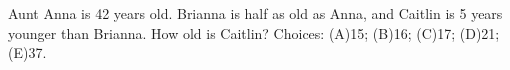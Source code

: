 Aunt Anna is 42 years old. Brianna is half as old as Anna, and Caitlin is 5 years younger than Brianna. How old is Caitlin? Choices: (A)15; (B)16; (C)17; (D)21; (E)37.
